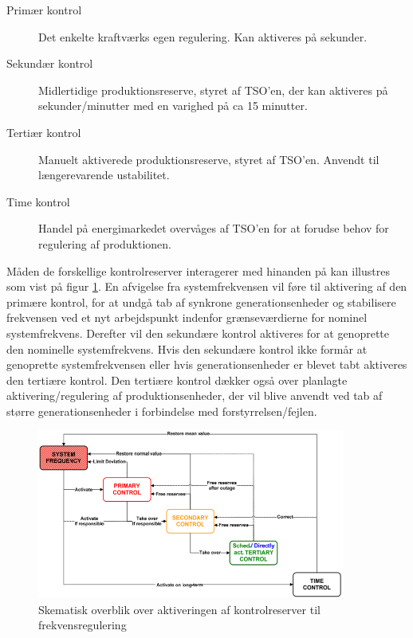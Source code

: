 \begin{description}
	\item[Primær kontrol] Det enkelte kraftværks egen regulering. Kan aktiveres på sekunder.
	\item[Sekundær kontrol] Midlertidige produktionsreserve, styret af TSO'en, der kan aktiveres på sekunder/minutter med en varighed på ca 15 minutter.
	\item[Tertiær kontrol] Manuelt aktiverede produktionsreserve, styret af TSO'en. Anvendt til længerevarende ustabilitet.
	\item[Time kontrol] Handel på energimarkedet overvåges af TSO'en for at forudse behov for regulering af produktionen.
\end{description}

Måden de forskellige kontrolreserver interagerer med hinanden på kan illustres som vist på figur \ref{fig:Frekvenskontrol}. En afvigelse fra systemfrekvensen vil føre til aktivering af den primære kontrol, for at undgå tab af synkrone generationsenheder og stabilisere frekvensen ved et nyt arbejdspunkt indenfor grænseværdierne for nominel systemfrekvens. Derefter vil den sekundære kontrol aktiveres for at genoprette den nominelle systemfrekvens. Hvis den sekundære kontrol ikke formår at genoprette systemfrekvensen eller hvis generationsenheder er blevet tabt aktiveres den tertiære kontrol. Den tertiære kontrol dækker også over planlagte aktivering/regulering af produktionsenheder, der vil blive anvendt ved tab af større generationsenheder i forbindelse med forstyrrelsen/fejlen.

\begin{figure}[H] %
	\centering
	\includegraphics[width=0.9\textwidth]{figurer/Frekvenskontrol}
	\caption{Skematisk overblik over aktiveringen af kontrolreserver til frekvensregulering}
	\label{fig:Frekvenskontrol}
\end{figure}

